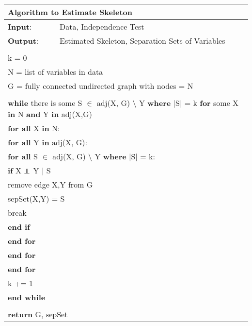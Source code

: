 \documentclass{article}
\newcommand\independent{\protect\mathpalette{\protect\independenT}{\perp}}
\def\independenT#1#2{\mathrel{\rlap{$#1#2$}\mkern2mu{#1#2}}}
\begin{document}
\begin{table}[h!]
	\begin{tabular}{|l l|}
		 \hline
		 \multicolumn{2}{|l|}{Algorithm to Estimate Skeleton}\\ 
		 \hline
		 \textbf{Input}: & Data, Independence Test\\
		 \textbf{Output}: & Estimated Skeleton, Separation Sets of Variables\\
		 &\\
		 \multicolumn{2}{|l|}{k = 0}\\
		 \multicolumn{2}{|l|}{N = list of variables in data}\\
		 \multicolumn{2}{|l|}{G = fully connected undirected graph with nodes = N}\\
		 &\\
		 \multicolumn{2}{|l|}{\textbf{while} there is some S $\in $ adj(X, G) $\setminus$ Y \textbf{where} $ | $S$ | $ = k \textbf{for} some X \textbf{in} N \textbf{and} Y \textbf{in} adj(X,G)}\\
		 \multicolumn{2}{|l|}{\quad\textbf{for all} X \textbf{in} N:}\\
		 \multicolumn{2}{|l|}{\quad\quad \textbf{for all} Y \textbf{in} adj(X, G):}\\
		 \multicolumn{2}{|l|}{\quad\quad\quad \textbf{for all} S $\in $ adj(X, G) $\setminus$ Y \textbf{where} $ | $S$ | $ = k:}\\
		 \multicolumn{2}{|l|}{\quad \quad \quad\quad \textbf{if} X $ \independent $ Y $ | $ S}\\
		 \multicolumn{2}{|l|}{\quad \quad \quad \quad\quad remove edge X,Y from G}\\
		 \multicolumn{2}{|l|}{\quad \quad \quad \quad\quad sepSet(X,Y) = S}\\
		 \multicolumn{2}{|l|}{\quad \quad \quad \quad\quad break}\\
		 \multicolumn{2}{|l|}{\quad \quad \quad\quad \textbf{end if}} \\
		 \multicolumn{2}{|l|}{\quad \quad\quad \textbf{end for}}\\
		 \multicolumn{2}{|l|}{\quad\quad \textbf{end for}}\\
		 \multicolumn{2}{|l|}{\quad\textbf{end for}}\\
		 \multicolumn{2}{|l|}{\quad k += 1}\\
		 \multicolumn{2}{|l|}{ \textbf{end while}}\\
		 &\\
		 \multicolumn{2}{|l|}{ \textbf{return} G, sepSet}\\
		 \hline
		 
	\end{tabular}
\end{table}
\end{document}

